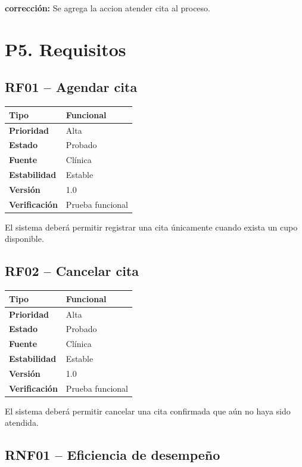 \documentclass[11pt,a4paper,oneside]{article}
\begin{document}
\textbf{corrección:} Se agrega la accion atender cita al proceso.

\section*{P5. Requisitos}

\subsection*{RF01 -- Agendar cita}

\begin{tabular}{|p{}|p{}|}
\hline
\textbf{Tipo} & Funcional \\ \hline
\textbf{Prioridad} & Alta \\ \hline
\textbf{Estado} & Probado \\ \hline
\textbf{Fuente} & Clínica \\ \hline
\textbf{Estabilidad} & Estable \\ \hline
\textbf{Versión} & 1.0 \\ \hline
\textbf{Verificación} & Prueba funcional \\ \hline
\end{tabular}

El sistema deberá permitir registrar una cita únicamente cuando exista un cupo disponible.

\subsection*{RF02 -- Cancelar cita}

\begin{tabular}{|p{}|p{}|}
\hline
\textbf{Tipo} & Funcional \\ \hline
\textbf{Prioridad} & Alta \\ \hline
\textbf{Estado} & Probado \\ \hline
\textbf{Fuente} & Clínica \\ \hline
\textbf{Estabilidad} & Estable \\ \hline
\textbf{Versión} & 1.0 \\ \hline
\textbf{Verificación} & Prueba funcional \\ \hline
\end{tabular}

El sistema deberá permitir cancelar una cita confirmada que aún no haya sido atendida.

\subsection*{RNF01 -- Eficiencia de desempeño}
\end{document}
